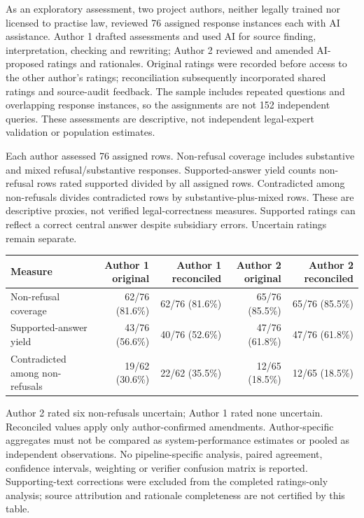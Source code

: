 As an exploratory assessment, two project authors, neither legally trained nor licensed to practise law, reviewed 76 assigned response instances each with AI assistance. Author 1 drafted assessments and used AI for source finding, interpretation, checking and rewriting; Author 2 reviewed and amended AI-proposed ratings and rationales. Original ratings were recorded before access to the other author's ratings; reconciliation subsequently incorporated shared ratings and source-audit feedback. The sample includes repeated questions and overlapping response instances, so the assignments are not 152 independent queries. These assessments are descriptive, not independent legal-expert validation or population estimates.

Each author assessed 76 assigned rows. Non-refusal coverage includes substantive and mixed refusal/substantive responses. Supported-answer yield counts non-refusal rows rated supported divided by all assigned rows. Contradicted among non-refusals divides contradicted rows by substantive-plus-mixed rows. These are descriptive proxies, not verified legal-correctness measures. Supported ratings can reflect a correct central answer despite subsidiary errors. Uncertain ratings remain separate.

\begin{center}\small
\begin{tabular}{lrrrr}\toprule
Measure & Author 1 original & Author 1 reconciled & Author 2 original & Author 2 reconciled \\\midrule
Non-refusal coverage & 62/76 (81.6\%) & 62/76 (81.6\%) & 65/76 (85.5\%) & 65/76 (85.5\%) \\
Supported-answer yield & 43/76 (56.6\%) & 40/76 (52.6\%) & 47/76 (61.8\%) & 47/76 (61.8\%) \\
Contradicted among non-refusals & 19/62 (30.6\%) & 22/62 (35.5\%) & 12/65 (18.5\%) & 12/65 (18.5\%) \\\bottomrule
\end{tabular}\end{center}

Author 2 rated six non-refusals uncertain; Author 1 rated none uncertain. Reconciled values apply only author-confirmed amendments. Author-specific aggregates must not be compared as system-performance estimates or pooled as independent observations. No pipeline-specific analysis, paired agreement, confidence intervals, weighting or verifier confusion matrix is reported. Supporting-text corrections were excluded from the completed ratings-only analysis; source attribution and rationale completeness are not certified by this table.

